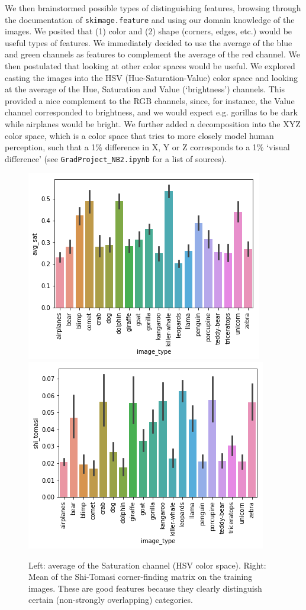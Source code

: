 \documentclass[aps,prl,twocolumn,superscriptaddress]{revtex4-1}
\renewcommand{\=}[1]{\stackrel{#1}{=}} %
\begin{document}
We then brainstormed possible types of distinguishing features, browsing through the documentation of  \texttt{skimage.feature} and using our domain knowledge of the images. We posited that (1) color and (2) shape (corners, edges, etc.) would be useful types of features. We immediately decided to use the average of the blue and green channels as features to complement the average of the red channel. We then postulated that looking at other color spaces would be useful. We explored casting the images into the HSV (Hue-Saturation-Value) color space and looking at the average of the Hue, Saturation and Value (`brightness') channels. This provided a nice complement to the RGB channels, since, for instance, the Value channel corresponded to brightness, and we would expect e.g. gorillas to be dark while airplanes would be bright. We further added a decomposition into the XYZ color space, which is a color space that tries to more closely model human perception, such that a 1\% difference in X, Y or Z corresponds to a 1\% `visual difference' (see \texttt{GradProject\_NB2.ipynb} for a list of sources). 

\begin{figure}
	\includegraphics[width = 0.49\columnwidth]{avg_sat.png}
	\includegraphics[width = 0.49\columnwidth]{shi_tomasi.png}
	\caption{\label{fig:EDA} Left: average of the Saturation channel (HSV color space). Right: Mean of the Shi-Tomasi corner-finding matrix on the training images. These are good features because they clearly distinguish certain (non-strongly overlapping) categories.}
\end{figure}
\end{document}
